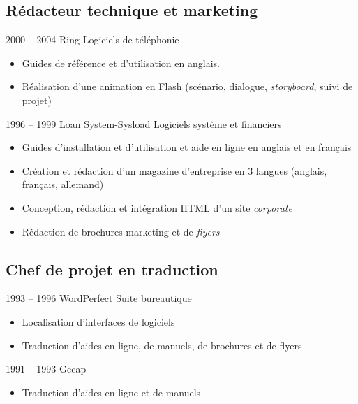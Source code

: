 \documentclass[11pt,a4paper,roman]{moderncv}
\begin{document}
\subsection{Rédacteur technique et marketing}

\cventry
    {2000 – 2004}
    {Ring}
    {Logiciels de téléphonie}
    {}
    {}
    {
      \begin{itemize}
      \item Guides de référence et d'utilisation en anglais.
      \item Réalisation d'une animation en Flash (scénario, dialogue,
        \textit{storyboard}, suivi de projet)
    \end{itemize}}


\cventry
    {1996 – 1999}
    {Loan System-Sysload}
    {Logiciels système et financiers}
    {}
    {}
    {
      \begin{itemize}
      \item Guides d'installation et d'utilisation et aide en ligne en anglais
        et en français
      \item Création et rédaction d'un magazine d'entreprise en 3 langues
        (anglais, français, allemand)
      \item Conception, rédaction et intégration HTML d'un site
        \textit{corporate}
      \item Rédaction de brochures marketing et de \textit{flyers}
      \end{itemize}
    }


\subsection{Chef de projet en traduction}

\cventry
    {1993 – 1996}
    {WordPerfect}
    {Suite bureautique}
    {}
    {}
    {
      \begin{itemize}
      \item Localisation d'interfaces de logiciels
      \item Traduction d'aides en ligne, de manuels, de brochures et de flyers
      \end{itemize}
    }


\cventry
    {1991 – 1993}
    {Gecap}
    {}
    {}
    {}
    {
      \begin{itemize}
      \item Traduction d'aides en ligne et de manuels
      \end{itemize}
    }
\end{document}
